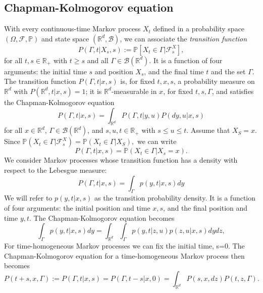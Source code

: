 \documentclass{article}
\begin{document}
\subsection*{Chapman-Kolmogorov equation}
With every continuous-time Markov process $X_t$ defined in a probability space $(\Omega,\mathcal{F}, \mathbb{P})$ and state space $(\mathbb{R}^d,\mathcal{B})$, we can associate the \textit{transition function} 
$$P(\Gamma,t |X_s,s):= \mathbb{P}[X_t\in \Gamma|\mathcal{F}_s^X],$$
for all $t,s\in \mathbb{R}_+$ with $t\geq s$ and all $\Gamma \in \mathcal{B}(\mathbb{R}^d).$ It is a function of four arguments: the initial time $s$ and position $X_s$, and the final time $t$ and the set $\Gamma$. The transition function $P(\Gamma,t|x,s)$ is, for fixed $t,x,s$, a probability measure on $\mathbb{R}^d$ with $P(\mathbb{R}^d,t|x,s)=1$;
it is $\mathbb{R}^d$-measurable in $x$, for fixed $t,s,\Gamma$, and satisfies the Chapman-Kolmogorov equation
\begin{equation*}
   P(\Gamma,t|x,s)=\int_{\mathbb{R}^d} P (\Gamma,t|y,u)P(dy,u|x,s) 
\end{equation*}
for all $x \in \mathbb{R}^d$, $\Gamma\in \mathcal{B}(\mathbb{R}^d)$, and $s,u,t \in \mathbb{R}_+$ with $s \leq u \leq t$. Assume that $X_S=x.$ Since $\mathbb{P}(X_t\in \Gamma |\mathcal{F}_s^X) = \mathbb{P}(X_t\in \Gamma|X_S),$ we can write
\begin{equation*}
    P(\Gamma,t|x,s)=\mathbb{P}(X_t \in \Gamma|X_s = x).
\end{equation*}
We consider Markov processes whose transition function has a density with respect to the Lebesgue measure:
\begin{equation*}
    P(\Gamma,t|x,s)=\int_{\Gamma}p(y,t|x,s)dy
\end{equation*}
We will refer to $p(y,t|x,s)$ as the transition probability density. It is a function of four arguments: the initial position and time $x,s$, and the final position and time $y,t$. The Chapman-Kolmogorov equation becomes
\begin{equation*}
    \int_{\Gamma}p(y,t|x,s)dy=\int_{\mathbb{R}^d}\int_{\Gamma} p(y,t|z,u)p(z,u|x,s)dydz,
\end{equation*}
For time-homogeneous Markov processes we can fix the initial time, s=0. The Chapman-Kolmogorov equation for a time-homogeneous Markov process then becomes 
\begin{equation}
    P(t+s,x,\Gamma):=P(\Gamma,t|x,s)=P(\Gamma,t-s|x,0)=\int_{\mathbb{R}^d}P(s,x,dz)P(t,z,\Gamma).\label{eq:chap}
\end{equation}
\end{document}

